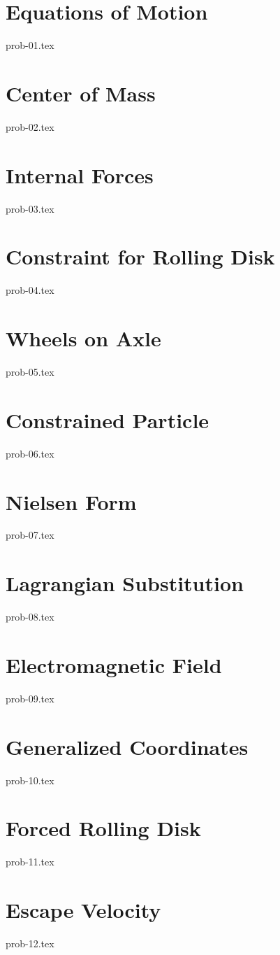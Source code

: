 \section{Equations of Motion}

{prob-01.tex}

\section{Center of Mass}

{prob-02.tex}

\section{Internal Forces}

{prob-03.tex}

\section{Constraint for Rolling Disk}\label{rollingdisk}

{prob-04.tex}

\section{Wheels on Axle}

{prob-05.tex}

\section{Constrained Particle}

{prob-06.tex}

\section{Nielsen Form}\label{nielsen}

{prob-07.tex}

\section{Lagrangian Substitution}\label{lagrangeinv}

{prob-08.tex}

\section{Electromagnetic Field}

{prob-09.tex}

\section{Generalized Coordinates}

{prob-10.tex}

\section{Forced Rolling Disk}

{prob-11.tex}

\section{Escape Velocity}

{prob-12.tex}
